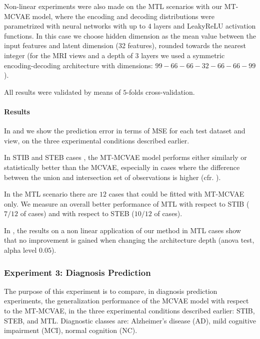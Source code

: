 Non-linear experiments were also made on the MTL scenarios with our MT-MCVAE model, where the encoding and decoding distributions were parametrized with neural networks with up to $4$ layers and LeakyReLU activation functions.
In this case we choose hidden dimension as the mean value between the input features and latent dimension (32 features), rounded towards the nearest integer
(\eg for the MRI views and a depth of $3$ layers we used a symmetric encoding-decoding architecture with dimensions: $99-66-66-32-66-66-99$).

All results were validated by means of $5$-folds cross-validation.



\paragraph{Results}
In  and  we show the prediction error in terms of MSE for each test dataset and view, on the three experimental conditions described earlier.

In STIB and STEB cases , the MT-MCVAE model performs either similarly or statistically better than the MCVAE, especially in cases where the difference between the union and intersection set of observations is higher (cfr. ).

In the MTL scenario  there are $12$ cases that could be fitted with MT-MCVAE only.
We measure an overall better performance of MTL with respect to STIB ($7/12$ of cases) and with respect to STEB ($10/12$ of cases).

In , the results on a non linear application of our method in MTL cases show
that no improvement is gained when changing the architecture depth (anova test, alpha level $0.05$).

\subsubsection{Experiment 3: Diagnosis Prediction}
\label{ssec:classifier}


The purpose of this experiment is to compare, in diagnosis prediction experiments, the generalization performance of the MCVAE model with respect to the MT-MCVAE,
in the three experimental conditions described earlier: STIB, STEB, and MTL.
%
Diagnostic classes are:
Alzheimer's disease (AD),
mild cognitive impairment (MCI),
normal cognition (NC).

